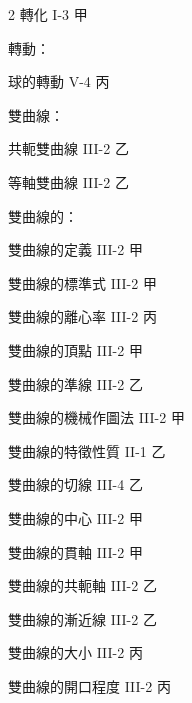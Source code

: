 \begin{multicols}{2}
\noindent 轉化 \hfill I-3 甲\par
\noindent 轉動：\par
\noindent\hspace*{1.5em} 球的轉動 \hfill V-4 丙\par
\noindent 雙曲線：\par
\noindent\hspace*{1.5em} 共軛雙曲線 \hfill III-2 乙\par
\noindent\hspace*{1.5em} 等軸雙曲線 \hfill III-2 乙\par
\noindent 雙曲線的：\par
\noindent\hspace*{1.5em} 雙曲線的定義 \hfill III-2 甲\par
\noindent\hspace*{1.5em} 雙曲線的標準式 \hfill III-2 甲\par
\noindent\hspace*{1.5em} 雙曲線的離心率 \hfill III-2 丙\par
\noindent\hspace*{1.5em} 雙曲線的頂點 \hfill III-2 甲\par
\noindent\hspace*{1.5em} 雙曲線的準線 \hfill III-2 乙\par
\noindent\hspace*{1.5em} 雙曲線的機械作圖法 \hfill III-2 甲\par
\noindent\hspace*{1.5em} 雙曲線的特徵性質 \hfill II-1 乙\par
\noindent\hspace*{1.5em} 雙曲線的切線 \hfill III-4 乙\par
\noindent\hspace*{1.5em} 雙曲線的中心 \hfill III-2 甲\par
\noindent\hspace*{1.5em} 雙曲線的貫軸 \hfill III-2 甲\par
\noindent\hspace*{1.5em} 雙曲線的共軛軸 \hfill III-2 乙\par
\noindent\hspace*{1.5em} 雙曲線的漸近線 \hfill III-2 乙\par
\noindent\hspace*{1.5em} 雙曲線的大小 \hfill III-2 丙\par
\noindent\hspace*{1.5em} 雙曲線的開口程度 \hfill III-2 丙\par

\end{multicols}
